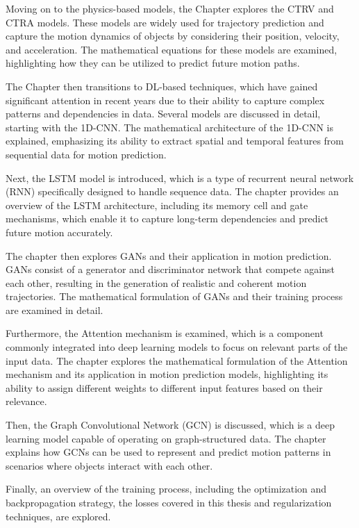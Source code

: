 Moving on to the physics-based models, the Chapter explores the \ac{CTRV} and \ac{CTRA} models. These models are widely used for trajectory prediction and capture the motion dynamics of objects by considering their position, velocity, and acceleration. The mathematical equations for these models are examined, highlighting how they can be utilized to predict future motion paths.

The Chapter then transitions to \ac{DL}-based techniques, which have gained significant attention in recent years due to their ability to capture complex patterns and dependencies in data. Several models are discussed in detail, starting with the 1D-\ac{CNN}. The mathematical architecture of the 1D-\ac{CNN} is explained, emphasizing its ability to extract spatial and temporal features from sequential data for motion prediction.

Next, the \ac{LSTM} model is introduced, which is a type of recurrent neural network (RNN) specifically designed to handle sequence data. The chapter provides an overview of the \ac{LSTM} architecture, including its memory cell and gate mechanisms, which enable it to capture long-term dependencies and predict future motion accurately.

The chapter then explores \acp{GAN} and their application in motion prediction. \acp{GAN} consist of a generator and discriminator network that compete against each other, resulting in the generation of realistic and coherent motion trajectories. The mathematical formulation of \acp{GAN} and their training process are examined in detail.

Furthermore, the Attention mechanism is examined, which is a component commonly integrated into deep learning models to focus on relevant parts of the input data. The chapter explores the mathematical formulation of the Attention mechanism and its application in motion prediction models, highlighting its ability to assign different weights to different input features based on their relevance.

Then, the Graph Convolutional Network (GCN) is discussed, which is a deep learning model capable of operating on graph-structured data. The chapter explains how GCNs can be used to represent and predict motion patterns in scenarios where objects interact with each other.

Finally, an overview of the training process, including the optimization and backpropagation strategy, the losses covered in this thesis and regularization techniques, are explored. %
